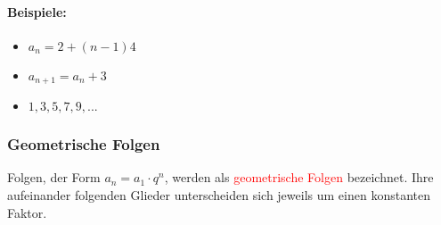 \paragraph{Beispiele:}\hspace{12 cm}
\begin{itemize}
\item $a_n = 2 + (n-1)4$
\item $a_{n+1} = a_n + 3$
\item $1,3,5,7,9,...$
\end{itemize}

\subsubsection{Geometrische Folgen}
Folgen, der Form $a_n = a_1 \cdot q^{n}$, werden als \textcolor{red}{geometrische Folgen} bezeichnet.
Ihre aufeinander folgenden Glieder unterscheiden sich jeweils um einen konstanten Faktor.
